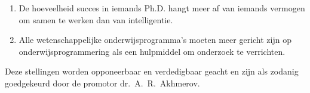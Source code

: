 \documentclass{dissertation}
\begin{document}
{\begin{enumerate}
\item De hoeveelheid succes in iemands Ph.D. hangt meer af van iemands vermogen om samen te werken dan van intelligentie.

\item Alle wetenschappelijke onderwijsprogramma's moeten meer gericht zijn op onderwijsprogrammering als een hulpmiddel om onderzoek te verrichten.


\end{enumerate}

\smallskip

\begin{center}
Deze stellingen worden opponeerbaar en verdedigbaar geacht en zijn als zodanig goedgekeurd door de promotor dr.\ A.\ R.\ Akhmerov.
\end{center}

}
\end{document}

